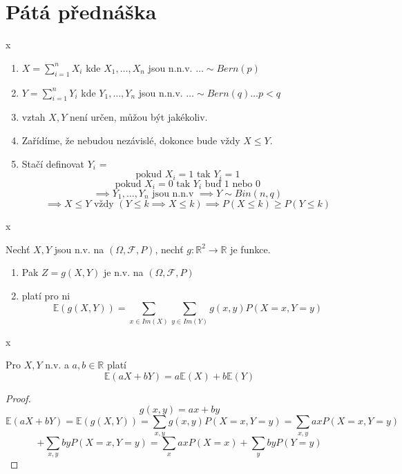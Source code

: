 \documentclass[../main.tex]{subfiles}
\begin{document}
\section{Pátá přednáška}

\begin{definition}[Coupling]
    {\color{white} x}

    \begin{enumerate}
        \item $X = \sum^n_{i=1} X_i$ kde $X_1,\dots , X_n$ jsou n.n.v. $\dots \sim Bern(p)$
        \item $Y = \sum^n_{i=1} Y_i$ kde $Y_1,\dots , Y_n$ jsou n.n.v. $\dots \sim Bern(q) \dots p < q$
        \item vztah $X,Y$ není určen, můžou být jakékoliv.
        \item Zařídíme, že nebudou nezávislé, dokonce bude vždy $X \leq Y$.
        \item Stačí definovat $Y_i$ =
        \[\text{pokud } X_i = 1 \text{ tak } Y_i = 1\]
        \[\text{pokud } X_i = 0 \text{ tak } Y_i \text{ buď } 1 \text{ nebo }0\]
        \[\implies Y_1,\dots,Y_n \text{ jsou n.n.v } \implies Y \sim Bin(n,q)\]
        \[\implies X \leq Y \text{ vždy } (Y \leq k \implies X\leq k) \implies P(X\leq k) \geq P(Y\leq k)\]
    \end{enumerate}
\end{definition}

\begin{theorem}
    {\color{white} x}

    Nechť $X,Y$ jsou n.v. na $(\Omega,\mathcal{F},P)$, nechť $g:\mathbb{R}^2 \rightarrow \mathbb{R}$ je funkce.
    \begin{enumerate}
        \item Pak $Z = g(X,Y)$ je n.v. na $(\Omega,\mathcal{F},P)$
        \item platí pro ni
        \[\mathbb{E}(g(X,Y)) = \sum_{x\in Im(X)} \sum_{y\in Im(Y)} g(x,y)P(X=x,Y=y)\]
    \end{enumerate}
\end{theorem}
\begin{theorem}
    {\color{white} x}

    Pro $X,Y$ n.v. a $a,b \in \mathbb{R}$ platí
    \[\mathbb{E}(aX+bY) = a\mathbb{E}(X)+b\mathbb{E}(Y)\]
\end{theorem}
\begin{proof}
    \[g(x,y) = ax+by\]
    \[\mathbb{E}(aX+bY) = \mathbb{E}(g(X,Y)) = \sum_{x,y} g(x,y) P(X=x,Y=y) = \sum_{x,y} axP(X=x,Y=y)\]
    \[+ \sum_{x,y}byP(X=x,Y=y) = \sum_{x}axP(X=x) + \sum_y byP(Y=y)\]
\end{proof}
\end{document}
